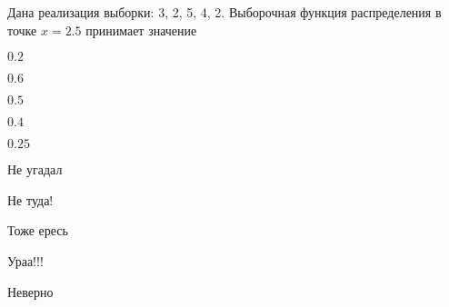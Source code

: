 
\begin{question}
Дана реализация выборки: 3, 2, 5, 4, 2. Выборочная функция распределения
в точке \(x=2.5\) принимает значение
\begin{answerlist}
  \item \(0.2\)
  \item \(0.6\)
  \item \(0.5\)
  \item \(0.4\)
  \item \(0.25\)
\end{answerlist}
\end{question}

\begin{solution}
\begin{answerlist}
  \item Не угадал
  \item Не туда!
  \item Тоже ересь
  \item Ураа!!!
  \item Неверно
\end{answerlist}
\end{solution}

